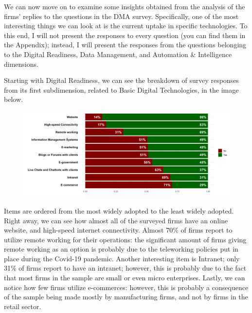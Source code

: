 \documentclass[12pt]{report}
\begin{document}
\par We can now move on to examine some insights obtained from the analysis of the firms' replies to the questions in the DMA survey. Specifically, one of the most interesting things we can look at is the current uptake in specific technologies. To this end, I will not present the responses to every question (you can find them in the Appendix); instead, I will present the responses from the questions belonging to the Digital Readiness, Data Management, and Automation \& Intelligence dimensions.

\par Starting with Digital Readiness, we can see the breakdown of survey responses from its first subdimension, related to Basic Digital Technologies, in the image below.
\begin{figure}[h!]
    \centering
    \includegraphics[width=\linewidth]{../Output/q3.png}
    \caption{}
    \label{fig:q3_table}
\end{figure}

\par Items are ordered from the most widely adopted to the least widely adopted. Right away, we can see how almost all of the surveyed firms have an online website, and high-speed internet connectivity. Almost 70\% of firms report to utilize remote working for their operations: the significant amount of firms giving remote working as an option is probably due to the teleworking policies put in place during the Covid-19 pandemic.
Another interesting item is Intranet; only 31\% of firms report to have an intranet; however, this is probably due to the fact that most firms in the sample are small or even micro enterprises. Lastly, we can notice how few firms utilize e-commerces: however, this is probably a consequence of the sample being made mostly by manufacturing firms, and not by firms in the retail sector.
\end{document}
